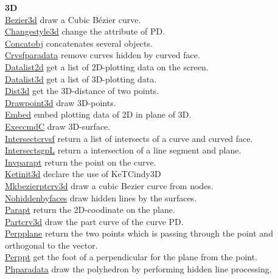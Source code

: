 \documentclass[papersize,a4paper,12pt]{article}
\begin{document}
\begin{tabbing}
{\bf \ketcindy 3D} \> \\
\hyperlink{bezier3d}{Bezier3d} \> draw a Cubic Bézier curve.\\
\hyperlink{changestyle3d}{Changestyle3d} \> change the attribute of PD.\\
\hyperlink{concatobj}{Concatobj} \> concatenates several objects.\\
\hyperlink{crvsfparadata}{Crvsfparadata} \> remove curves hidden by curved face.\\
\hyperlink{datalist2d}{Datalist2d} \> get a list of 2D-plotting data on the screen.\\
\hyperlink{datalist3d}{Datalist3d} \> get a list of 3D-plotting data.\\
\hyperlink{dist3d}{Dist3d} \> get the 3D-distance of two points.\\
\hyperlink{drawpoint3d}{Drawpoint3d} \> draw 3D-points.\\
\hyperlink{embed}{Embed} \> embed plotting data of 2D in plane of 3D.\\
\hyperlink{execcmdc}{ExeccmdC} \> draw 3D-surface.\\
\hyperlink{intersectcrvsf}{Intersectcrvsf} \> return a list of intersects of a curve and curved face.\\
\hyperlink{intersectsgpL}{IntersectsgpL} \>return a intersection of a line segment and plane.\\
\hyperlink{invparapt}{Invparapt} \> return the point on the curve.\\
\hyperlink{ketinit3d}{Ketinit3d} \> declare the use of KeTCindy3D\\
\hyperlink{mkbezierptcrv3d}{Mkbezierptcrv3d} \> draw a cubic Bezier curve from nodes.\\
\hyperlink{nohiddenbyfaces}{Nohiddenbyfaces} \>  draw hidden lines by the surfaces.\\
\hyperlink{parapt}{Parapt} \> return the 2D-coodinate on the plane.\\
\hyperlink{partcrv3d}{Partcrv3d} \> draw the part curve of the curve PD.\\
\hyperlink{perpplane}{Perpplane} \> return the two points  which is passing through the point and\\
\>orthogonal to the vector.\\
\hyperlink{perppt}{Perppt} \> get the foot of a perpendicular for the plane from the point.\\
\hyperlink{phparadata}{Phparadata} \> draw the polyhedron by performing hidden line processing.\\

\end{tabbing}
\end{document}
